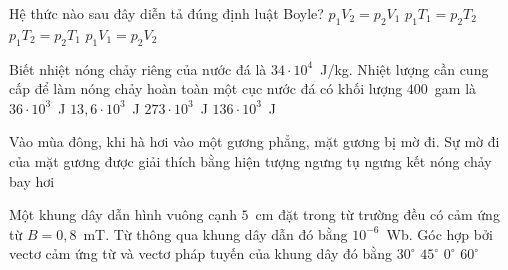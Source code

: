 	\begin{ex}%
		Hệ thức nào sau đây diễn tả đúng định luật Boyle?
		\choice
		{$p_1V_2=p_2V_1$}
		{$p_1T_1=p_2T_2$}
		{$p_1T_2=p_2T_1$}
		{\True $p_1V_1=p_2V_2$}
	\end{ex}

	\begin{ex}%
		Biết nhiệt nóng chảy riêng của nước đá là $34\cdot 10^4$~J/kg. Nhiệt lượng cần cung cấp để làm nóng chảy hoàn toàn một cục nước đá có khối lượng $400$~gam là
		\choice
		{$36\cdot 10^3$~J}
		{$13{,}6\cdot 10^3$~J}
		{$273\cdot 10^3$~J}
		{\True $136\cdot 10^3$~J}
	\end{ex}

	\begin{ex}%
		Vào mùa đông, khi hà hơi vào một gương phẳng, mặt gương bị mờ đi. Sự mờ đi của mặt gương được giải thích bằng hiện tượng
		\choice
		{\True ngưng tụ}
		{ngưng kết}
		{nóng chảy}
		{bay hơi}
	\end{ex}

	\begin{ex}%
		Một khung dây dẫn hình vuông cạnh $5$~cm đặt trong từ trường đều có cảm ứng từ $B=0{,}8$~mT. Từ thông qua khung dây dẫn đó bằng $10^{-6}$~Wb. Góc hợp bởi vectơ cảm ứng từ và vectơ pháp tuyến của khung dây đó bằng
		\choice
		{$30^\circ$}
		{$45^\circ$}
		{$0^\circ$}
		{\True $60^\circ$}
	\end{ex}

